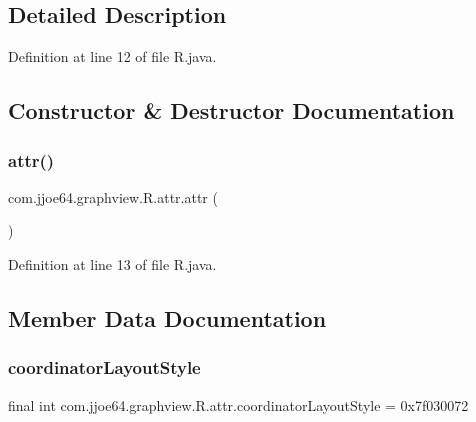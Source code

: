 \subsection{Detailed Description}


Definition at line 12 of file R.\+java.



\subsection{Constructor \& Destructor Documentation}
\mbox{\label{classcom_1_1jjoe64_1_1graphview_1_1_r_1_1attr_a646ba5ebaec816238ec3e4a3ad0d5a93}} 
\subsubsection{\texorpdfstring{attr()}{attr()}}
{\footnotesize\ttfamily com.\+jjoe64.\+graphview.\+R.\+attr.\+attr (\begin{DoxyParamCaption}{ }\end{DoxyParamCaption})\hspace{0.3cm}{\ttfamily [private]}}



Definition at line 13 of file R.\+java.


\begin{DoxyCode}{0}

\end{DoxyCode}


\subsection{Member Data Documentation}
\mbox{\label{classcom_1_1jjoe64_1_1graphview_1_1_r_1_1attr_a031268af1f64363f6fe3a91f44f0bd60}} 
\subsubsection{\texorpdfstring{coordinatorLayoutStyle}{coordinatorLayoutStyle}}
{\footnotesize\ttfamily final int com.\+jjoe64.\+graphview.\+R.\+attr.\+coordinator\+Layout\+Style = 0x7f030072\hspace{0.3cm}{\ttfamily [static]}}



